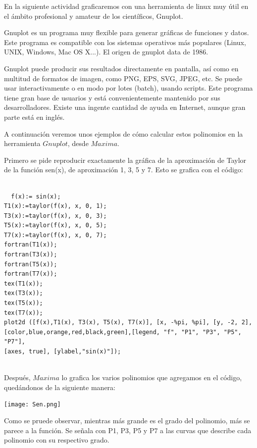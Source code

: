 \documentclass[12pt]{article}
\begin{document}
En la siguiente actividad graficaremos con una herramienta de linux muy útil en el ámbito profesional y amateur de los científicos, Gnuplot.

Gnuplot es un programa muy flexible para generar gráficas de funciones y datos. Este programa es compatible con los sistemas operativos más populares (Linux, UNIX, Windows, Mac OS X...). El origen de gnuplot data de 1986.

Gnuplot puede producir sus resultados directamente en pantalla, así como en multitud de formatos de imagen, como PNG, EPS, SVG, JPEG, etc. Se puede usar interactivamente o en modo por lotes (batch), usando scripts. Este programa tiene gran base de usuarios y está convenientemente mantenido por sus desarrolladores. Existe una ingente cantidad de ayuda en Internet, aunque gran parte está en inglés.

\vspace {0.5cm}

\hspace {0.5cm} A continuación veremos unos ejemplos de cómo calcular estos polinomios en la herramienta $Gnuplot$, desde $Maxima$.

\vspace {0.5cm} Primero se pide reproducir exactamente la gráfica de la aproximación de Taylor de la función sen(x), de aproximación 1, 3, 5 y 7. Esto se grafica con el código:
     
     \begin{verbatim}
     
  f(x):= sin(x);
T1(x):=taylor(f(x), x, 0, 1);
T3(x):=taylor(f(x), x, 0, 3);
T5(x):=taylor(f(x), x, 0, 5);
T7(x):=taylor(f(x), x, 0, 7);
fortran(T1(x));
fortran(T3(x));
fortran(T5(x));
fortran(T7(x));
tex(T1(x));
tex(T3(x));
tex(T5(x));
tex(T7(x));
plot2d ([f(x),T1(x), T3(x), T5(x), T7(x)], [x, -%pi, %pi], [y, -2, 2], 
[color,blue,orange,red,black,green],[legend, "f", "P1", "P3", "P5", "P7"],       
[axes, true], [ylabel,"sin(x)"]); 
    
     \end{verbatim}
     
Después, $Maxima$ lo grafica los varios polinomios que agregamos en el código, quedándonos de la siguiente manera:

\begin{center}
	\texttt{[image: Sen.png]}\\
\end{center}

Como se pruede observar, mientras más grande es el grado del polinomio, más se parece a la función. Se señala con P1, P3, P5 y P7 a las curvas que describe cada polinomio con su respectivo grado.
\end{document}
